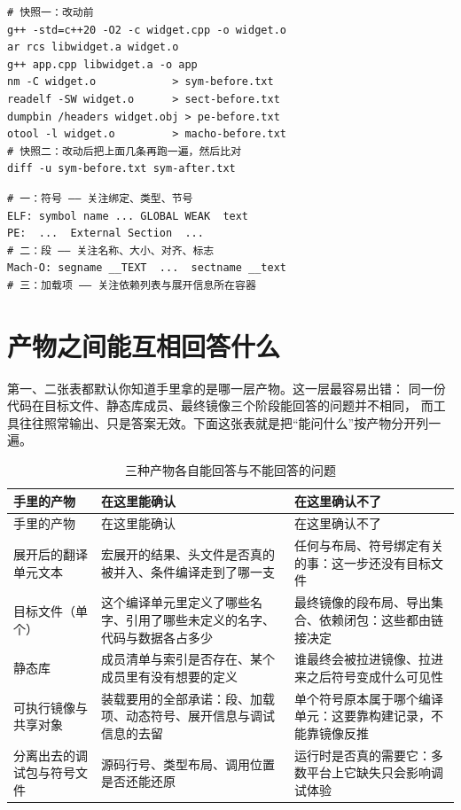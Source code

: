 \documentclass[12pt,a4paper,fontset=fandol]{ctexbook}
\begin{document}
\begin{lstlisting}[style=shellstyle, caption={改动前后各跑一次：符号、段、加载项三份快照}]
# 快照一：改动前
g++ -std=c++20 -O2 -c widget.cpp -o widget.o
ar rcs libwidget.a widget.o
g++ app.cpp libwidget.a -o app
nm -C widget.o            > sym-before.txt
readelf -SW widget.o      > sect-before.txt
dumpbin /headers widget.obj > pe-before.txt
otool -l widget.o         > macho-before.txt
# 快照二：改动后把上面几条再跑一遍，然后比对
diff -u sym-before.txt sym-after.txt
\end{lstlisting}

\begin{lstlisting}[style=outstyle, caption={三份快照长什么样：字段名示意，非某次实测输出}]
# 一：符号 —— 关注绑定、类型、节号
ELF: symbol name ... GLOBAL WEAK  text
PE:  ...  External Section  ...
# 二：段 —— 关注名称、大小、对齐、标志
Mach-O: segname __TEXT  ...  sectname __text
# 三：加载项 —— 关注依赖列表与展开信息所在容器
\end{lstlisting}

\section{产物之间能互相回答什么}

第一、二张表都默认你知道手里拿的是哪一层产物。这一层最容易出错：
同一份代码在目标文件、静态库成员、最终镜像三个阶段能回答的问题并不相同，
而工具往往照常输出、只是答案无效。下面这张表就是把“能问什么”按产物分开列一遍。

\begin{longtable}{@{}>{\raggedright\arraybackslash}p{} >{\raggedright\arraybackslash}p{} >{\raggedright\arraybackslash}p{}@{}}
\caption{三种产物各自能回答与不能回答的问题}\label{tab:apA-artifacts}\\
\toprule
手里的产物 & 在这里能确认 & 在这里确认不了 \\
\midrule
\endfirsthead
\toprule
手里的产物 & 在这里能确认 & 在这里确认不了 \\
\midrule
\endhead
\bottomrule
\endfoot
展开后的翻译单元文本 &
宏展开的结果、头文件是否真的被并入、条件编译走到了哪一支 &
任何与布局、符号绑定有关的事：这一步还没有目标文件 \\
目标文件（单个） &
这个编译单元里定义了哪些名字、引用了哪些未定义的名字、代码与数据各占多少 &
最终镜像的段布局、导出集合、依赖闭包：这些都由链接决定 \\
静态库 &
成员清单与索引是否存在、某个成员里有没有想要的定义 &
谁最终会被拉进镜像、拉进来之后符号变成什么可见性 \\
可执行镜像与共享对象 &
装载要用的全部承诺：段、加载项、动态符号、展开信息与调试信息的去留 &
单个符号原本属于哪个编译单元：这要靠构建记录，不能靠镜像反推 \\
分离出去的调试包与符号文件 &
源码行号、类型布局、调用位置是否还能还原 &
运行时是否真的需要它：多数平台上它缺失只会影响调试体验 \\
\end{longtable}
\end{document}
